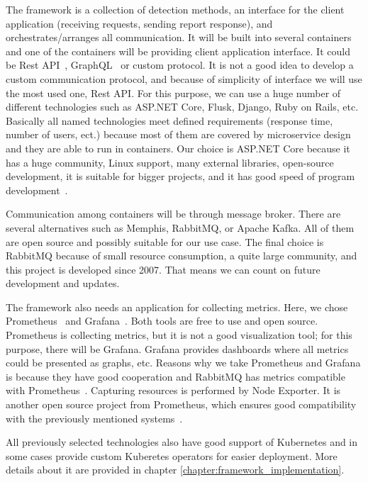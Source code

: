The framework is a collection of detection methods, an interface for the client application (receiving requests, sending report response), and orchestrates/arranges all communication. It will be built into several containers and one of the containers will be providing client application interface. It could be Rest API~\cite{RestAPI}, GraphQL~\cite{GraphQL} or custom protocol. It is not a good idea to develop a custom communication protocol, and because of simplicity of interface we will use the most used one, Rest API. For this purpose, we can use a huge number of different technologies such as ASP.NET Core, Flusk, Django, Ruby on Rails, etc. Basically all named technologies meet defined requirements (response time, number of users, ect.) because most of them are covered by microservice design and they are able to run in containers. Our choice is ASP.NET Core because it has a huge community, Linux support, many external libraries, open-source development, it is suitable for bigger projects, and it has good speed of program development~\cite{ASPNETCore}.

Communication among containers will be through message broker. There are several alternatives such as Memphis, RabbitMQ, or Apache Kafka. All of them are open source and possibly suitable for our use case. The final choice is RabbitMQ because of small resource consumption, a quite large community, and this project is developed since 2007. That means we can count on future development and updates.~\cite{MessageBrokers}

The framework also needs an application for collecting metrics. Here, we chose Prome\-theus~\cite{Prometheus} and Grafana~\cite{Grafana}. Both tools are free to use and open source. Prometheus is collecting metrics, but it is not a good visualization tool; for this purpose, there will be Grafana. Grafana provides dashboards where all metrics could be presented as graphs, etc. Reasons why we take Prometheus and Grafana is because they have good cooperation and RabbitMQ has metrics compatible with Prometheus~\cite{RabbitMQMonitoring}. Capturing resources is performed by Node Exporter. It is another open source project from Prometheus, which ensures good compatibility with the previously mentioned systems~\cite{NodeExporter}.

All previously selected technologies also have good support of Kubernetes and in some cases provide custom Kuberetes operators for easier deployment. More details about it are provided in chapter \ref{chapter:framework_implementation}.

